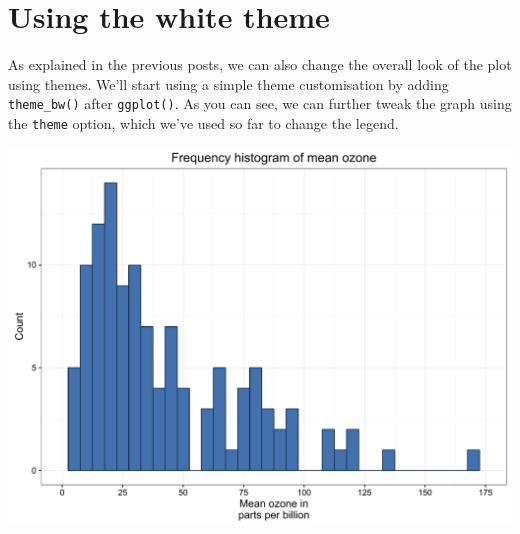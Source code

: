 \section{Using the white theme}\label{using-the-white-theme-6}

As explained in the previous posts, we can also change the overall look
of the plot using themes. We'll start using a simple theme customisation
by adding \texttt{theme\_bw()} after \texttt{ggplot()}. As you can see,
we can further tweak the graph using the \texttt{theme} option, which
we've used so far to change the legend.

\begin{Shaded}
\begin{Highlighting}[]

\StringTok{ }\NormalTok{(} \StringTok{ }
\StringTok{      }\NormalTok{(}\NormalTok{(}  \NormalTok{,}
\StringTok{        }  
\StringTok{      }\NormalTok{(} \NormalTok{,}
\StringTok{        } \NormalTok{(}\NormalTok{, }\NormalTok{, }\NormalTok{),}
\StringTok{        }\NormalTok{(}\NormalTok{, }\NormalTok{)) +}
\StringTok{      }\NormalTok{(} \NormalTok{) +}
\StringTok{      }\NormalTok{(}\NormalTok{) +}
\StringTok{      }\NormalTok{()}
\end{Highlighting}
\end{Shaded}

\begin{center}\includegraphics[width=0.55\linewidth]{figures/histogram_13-1} \end{center}

